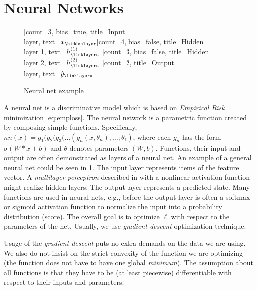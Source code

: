 \section{Neural Networks}
\begin{figure}
    \centering
    \begin{neuralnetwork}[height=4]
        \newcommand{\x}[2]{$x_#2$}
        \newcommand{\y}[2]{$\hat{y}_#2$}
        \newcommand{\hfirst}[2]{\small $h^{(1)}_#2$}
        \newcommand{\hsecond}[2]{\small $h^{(2)}_#2$}
        [count=3, bias=true, title=Input\\layer, text=\x]
        \hiddenlayer[count=4, bias=false, title=Hidden\\layer 1, text=\hfirst] \linklayers
        \hiddenlayer[count=3, bias=false, title=Hidden\\layer 2, text=\hsecond] \linklayers
        \outputlayer[count=2, title=Output\\layer, text=\y] \linklayers
    \end{neuralnetwork}
    \caption{Neural net example}
    \label{fig:neuralnet}
\end{figure}

A neural net is a discriminative model which is based on \emph{Empirical Risk} minimization \eqref{eq:emploss}. The neural network is a parametric function created by composing simple functions. Specifically, $nn(x) = g_1(g_2(g_3(\dots(g_n(x,\theta_n),\dots;\theta_1)$, where each $g_n$ has the form $\sigma(W * x + b)$ and $\theta$ denotes parameters $(W,b)$. Functions, their input and output are often demonstrated as layers of a neural net. An example of a general neural net could be seen in \ref{fig:neuralnet}. The input layer represents items of the feature vector. A \emph{multilayer perceptron} described in \cite{Russell2009} with a nonlinear activation function might realize hidden layers. The output layer represents a predicted state. Many functions are used in neural nets, e.g., before the output layer is often a softmax or sigmoid activation function to normalize the input into a probability distribution (score). The overall goal is to optimize $\ell$ with respect to the parameters of the net. Usually, we use \emph{gradient descent} optimization technique.

Usage of the \emph{gradient descent} puts no extra demands on the data we are using. We also do not insist on the strict convexity of the function we are optimizing (the function does not have to have one global \emph{minimum}). The assumption about all functions is that they have to be (at least piecewise) differentiable with respect to their inputs and parameters. 

